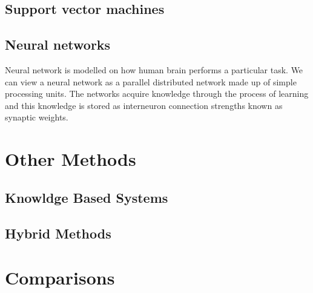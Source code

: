 \subsection{Support vector machines}

\subsection{Neural networks}
Neural network is modelled on how human brain performs a particular task. We can view a neural
network as a parallel distributed network made up of simple processing units. The networks acquire
knowledge through the process of learning and this knowledge is stored as interneuron connection
strengths known as synaptic weights.

\section{Other Methods}

\subsection{Knowldge Based Systems}

\subsection{Hybrid Methods}

\section{Comparisons}

